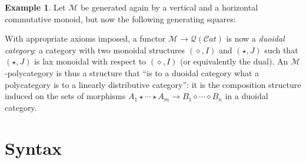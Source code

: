 \documentclass{article}
\theoremstyle{definition}
\newtheorem{eg}{Example}
\def\M{\mathcal{M}}
\def\Q{\mathcal{Q}}
\def\Cat{\mathcal{C}\mathit{at}}
\def\twocell#1#2#3{\ar[from=#1,to=#2,phantom,""{name=1,near start},""{name=2,near end}]\ar[Rightarrow,from=1,to=2,"#3"]}
\def\drtwocell{\twocell{r}{d}}
\def\drrtwocell{\twocell{rr}{d}}
\begin{document}
\begin{eg}\label{eg:duoidal}
  Let $\M$ be generated again by a vertical and a horizontal commutative monoid, but now the following generating squares:
  With appropriate axioms imposed, a functor $\M\to\Q(\Cat)$ is now a \emph{duoidal category}: a category with two monoidal structures $(\diamond,I)$ and $(\star,J)$ such that $(\star,J)$ is lax monoidal with respect to $(\diamond,I)$ (or equivalently the dual).
  An $\M$-polycategory is thus a structure that ``is to a duoidal category what a polycategory is to a linearly distributive category'': it is the composition structure induced on the sets of morphisms $A_1 \star \cdots \star A_m \to B_1\diamond \cdots \diamond B_n$ in a duoidal category.
\end{eg}

\section{Syntax}
\label{sec:syntax}
\end{document}
